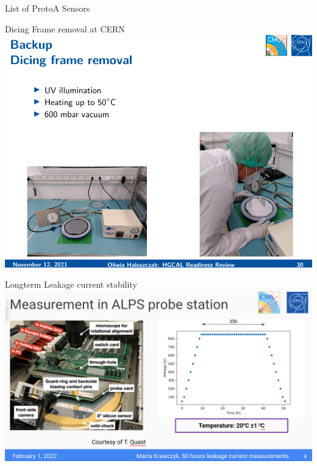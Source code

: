 \documentclass{beamer}
\begin{document}
\begin{frame}{List of ProtoA Sensors}
    
\end{frame}

\begin{frame}{Dicing Frame removal at CERN}
  \includegraphics[width=.7\textwidth]{plots/DF_removal_Process.png}
\end{frame}

\begin{frame}{Longterm Leakage current stability}
  \includegraphics[width=.7\textwidth]{plots/Longterm_process.png}
\end{frame}
\end{document}
